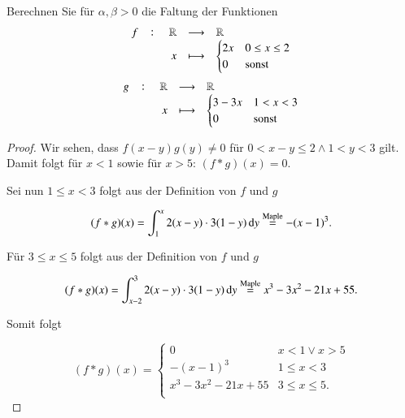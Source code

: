 
\begin{exercise}
  Berechnen Sie für $\alpha,\beta>0$ die Faltung der Funktionen
  \begin{equation*}
    \fullfunction{f}{\R}{\R}{x}{
      \begin{cases}
        2x & 0 \leq x \leq 2\\
        0 & \text{sonst}\\
    \end{cases}}
  \end{equation*}
  \begin{equation*}
    \fullfunction{g}{\R}{\R}{x}{
      \begin{cases}
        3-3x & 1 < x < 3\\
        0 & \text{sonst}\\
    \end{cases}}
  \end{equation*}
\end{exercise}
\begin{proof}
  Wir sehen, dass $f(x-y)g(y) \neq 0$ für $0<x-y \leq 2 \land 1 < y < 3$ gilt. Damit folgt für $x<1$ sowie für $x>5$: $(f \ast g)(x)=0$.

  Sei nun $1 \leq x < 3$ folgt aus der Definition von $f$ und $g$

  \begin{equation*}
    (f \ast g)(x)=\int_1^x{2(x-y) \cdot 3(1-y) \dif y} \stackrel{\text{Maple}}{=} -{(x-1)}^3.
  \end{equation*}

  Für $3 \leq x \leq 5$ folgt aus der Definition von $f$ und $g$

  \begin{equation*}
    (f \ast g)(x)=\int_{x-2}^3{2(x-y) \cdot 3(1-y) \dif y} \stackrel{\text{Maple}}{=} x^3-3x^2-21x+55.
  \end{equation*}

  Somit folgt

  \begin{equation*}
    (f \ast g)(x)=
    \begin{cases}
      0 & x < 1 \lor x > 5 \\
      -(x-1)^3 & 1 \leq x < 3 \\
      x^3 - 3x^2 -21x + 55 & 3 \leq x \leq 5. \\
    \end{cases}
  \end{equation*}
\end{proof}
